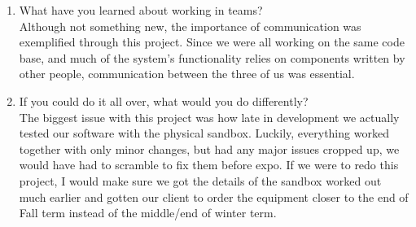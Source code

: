 \documentclass[onecolumn, draftclsnofoot,10pt, compsoc]{IEEEtran}
\begin{document}
\begin{enumerate}
\item What have you learned about working in teams?\\
Although not something new, the importance of communication was exemplified through this project. Since we were all working on the same code base, and much of the system's functionality relies on components written by other people, communication between the three of us was essential. 

\item If you could do it all over, what would you do differently?\\
The biggest issue with this project was how late in development we actually tested our software with the physical sandbox. Luckily, everything worked together with only minor changes, but had any major issues cropped up, we would have had to scramble to fix them before expo. If we were to redo this project, I would make sure we got the details of the sandbox worked out much earlier and gotten our client to order the equipment closer to the end of Fall term instead of the middle/end of winter term.


\end{enumerate}
\end{document}
